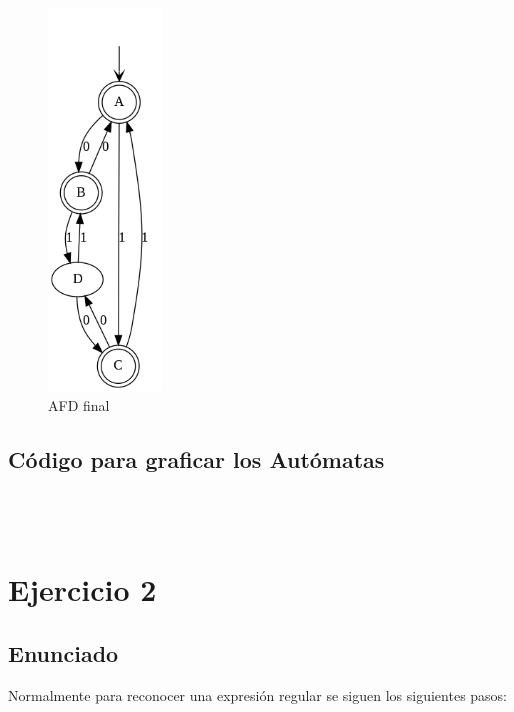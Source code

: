 \documentclass[https://www.overleaf.com/project/63761df255a8a9f4a15c3579
	letterpaper, %
	10pt, %
]{CSUniSchoolLabReport}
\begin{document}
\begin{figure}[H]
	\centering
	\includegraphics[width=0.27\textwidth]{images/automata2.png}
    \caption{AFD final}
\end{figure}



\subsection*{Código para graficar los Autómatas}


\\\\

\section*{Ejercicio 2 }

\subsection*{Enunciado}
Normalmente para reconocer una expresión regular se siguen los siguientes pasos:\\
\end{document}
